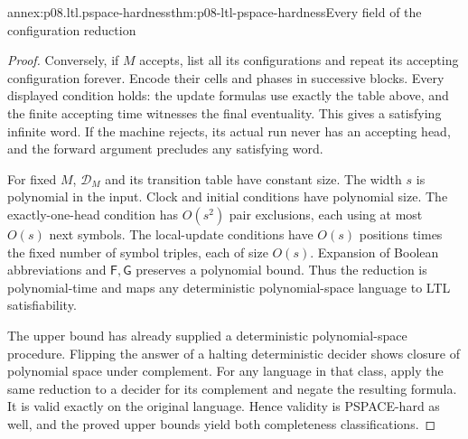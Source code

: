 \begin{annexitem}{annex:p08.ltl.pspace-hardness}{thm:p08-ltl-pspace-hardness}{Every field of the configuration reduction}
\begin{proof}
Conversely, if \(M\) accepts, list all its configurations
and repeat its accepting configuration forever. Encode their
cells and phases in successive blocks. Every displayed
condition holds: the update formulas use exactly the table
above, and the finite accepting time witnesses the final
eventuality. This gives a satisfying infinite word. If the
machine rejects, its actual run never has an accepting head,
and the forward argument precludes any satisfying word.

For fixed \(M\), \(\mathcal D_M\) and its transition table have
constant size. The width \(s\) is polynomial in the input.
Clock and initial conditions have polynomial size. The
exactly-one-head condition has \(O(s^2)\) pair exclusions,
each using at most \(O(s)\) next symbols. The local-update
conditions have \(O(s)\) positions times the fixed number
of symbol triples, each of size \(O(s)\). Expansion of
Boolean abbreviations and \(\mathsf F,\mathsf G\) preserves
a polynomial bound. Thus the reduction is polynomial-time
and maps any deterministic polynomial-space language to
LTL satisfiability.

The upper bound has already supplied a deterministic
polynomial-space procedure. Flipping the answer of a halting
deterministic decider shows closure of polynomial space
under complement. For any language in that class, apply the
same reduction to a decider for its complement and negate
the resulting formula. It is valid exactly on the original
language. Hence validity is PSPACE-hard as well, and the
proved upper bounds yield both completeness classifications.
\end{proof}
\end{annexitem}

